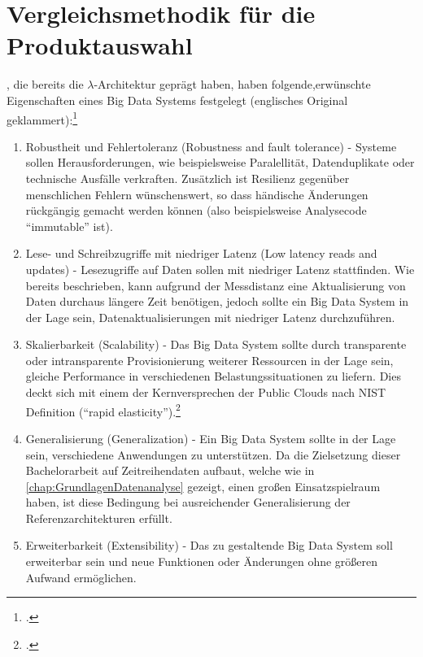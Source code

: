\section{Vergleichsmethodik für die Produktauswahl}\label{chap:vergleichsmethodik}

\citeauthor{Marz.2015}, die bereits die $\lambda$-Architektur geprägt haben, haben folgende,erwünschte Eigenschaften eines Big Data Systems festgelegt (englisches Original geklammert):\footcite[Vgl.][7\psqq]{Marz.2015}
\begin{enumerate}
\item Robustheit und Fehlertoleranz (Robustness and fault tolerance) - 
Systeme sollen Herausforderungen, wie beispielsweise Paralellität, Datenduplikate oder technische Ausfälle verkraften. Zusätzlich ist Resilienz gegenüber menschlichen Fehlern wünschenswert, so dass händische Änderungen rückgängig gemacht werden können (also beispielsweise Analysecode \enquote{immutable} ist).

\item Lese- und Schreibzugriffe mit niedriger Latenz (Low latency reads and updates) - 
Lesezugriffe auf Daten sollen mit niedriger Latenz stattfinden. Wie bereits beschrieben, kann aufgrund der Messdistanz eine Aktualisierung von Daten durchaus längere Zeit benötigen, jedoch sollte ein Big Data System in der Lage sein, Datenaktualisierungen mit niedriger Latenz durchzuführen.

\item Skalierbarkeit (Scalability) - 
Das Big Data System sollte durch transparente oder intransparente Provisionierung weiterer Ressourcen in der Lage sein, gleiche Performance in verschiedenen Belastungssituationen zu liefern. Dies deckt sich mit einem der Kernversprechen der Public Clouds nach NIST Definition (\enquote{rapid elasticity}).\footcite[Vgl.][2]{Mell.2011}

\item Generalisierung (Generalization) - 
Ein Big Data System sollte in der Lage sein, verschiedene Anwendungen zu unterstützen. Da die Zielsetzung dieser Bachelorarbeit auf Zeitreihendaten aufbaut, welche wie in \autoref{chap:GrundlagenDatenanalyse} gezeigt, einen großen Einsatzspielraum haben, ist diese Bedingung bei ausreichender Generalisierung der Referenzarchitekturen erfüllt.

\item Erweiterbarkeit (Extensibility) - 
Das zu gestaltende Big Data System soll erweiterbar sein und neue Funktionen oder Änderungen ohne größeren Aufwand ermöglichen.


\end{enumerate}
